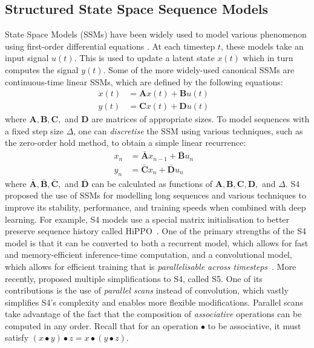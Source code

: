 \documentclass{article}
\newcommand{\oldop}{\bullet}
\begin{document}
\subsection{Structured State Space Sequence Models}
\label{subsec:s4}
State Space Models (SSMs) have been widely used to model various phenomenon  using first-order differential equations \cite{hamilton1994state}. At each timestep $t$, these models take an input signal $u(t)$. This is used to update a latent state $x(t)$ which in turn computes the signal $y(t)$. Some of the more widely-used canonical SSMs are continuous-time linear SSMs, which are defined by the following equations:
\begin{align}
\dot{x}(t) &= \mathbf{A}x(t) + \mathbf{B}u(t)&\\
y(t) &= \mathbf{C}x(t) + \mathbf{D}u(t) \nonumber
\end{align}
where $\mathbf{A}, \mathbf{B}, \mathbf{C},$ and $\mathbf{D}$ are matrices of appropriate sizes. To model sequences with a fixed step size $\Delta$, one can \textit{discretise} the SSM using various techniques, such as the zero-order hold method, to obtain a simple linear recurrence:
\begin{align}
\label{eq:discretised-ssm}
x_n &= \mathbf{\bar{A}} x_{n-1} + \mathbf{\bar{B}} u_n&\\
y_n &= \mathbf{\bar{C}}x_{n} + \mathbf{\bar{D}}u_n \nonumber
\end{align}
where $\mathbf{\bar{A}}, \mathbf{\bar{B}}, \mathbf{\bar{C}},$ and $\mathbf{\bar{D}}$ can be calculated as functions of $\mathbf{A}, \mathbf{B}, \mathbf{C}, \mathbf{D},$ and $\Delta$.
S4~\citep{gu2021efficiently} proposed the use of SSMs for modelling long sequences and various techniques to improve its stability, performance, and training speeds when combined with deep learning. For example, S4 models use a special matrix initialisation to better preserve sequence history called HiPPO~\citep{gu2020hippo}.
One of the primary strengths of the S4 model is that it can be converted to both a recurrent model, which allows for fast and memory-efficient inference-time computation, and a convolutional model, which allows for efficient training that is \textit{parallelisable across timesteps}~\citep{gu2021combining}.
More recently, \citet{smith2022simplified} proposed multiple simplifications to S4, called S5. One of its contributions is the use of \textit{parallel scans} instead of convolution, which vastly simplifies S4's complexity and enables more flexible modifications. Parallel scans take advantage of the fact that the composition of \textit{associative} operations can be computed in any order. Recall that for an operation $\oldop$ to be associative, it must satisfy $(x \oldop y) \oldop z = x \oldop (y \oldop z)$.
\end{document}
